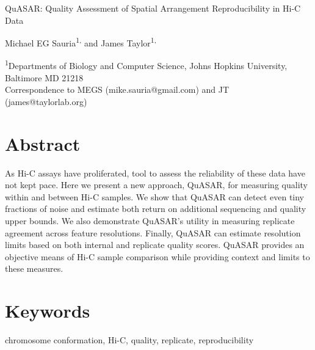 \documentclass[letterpaper,11pt,english]{article}
\begin{document}
{\sffamily

{\fontsize{16pt}{16pt}\selectfont QuASAR: Quality Assessment of Spatial Arrangement Reproducibility in Hi-C Data}

\vspace{1em}

Michael EG Sauria\textsuperscript{1,\dagger} and James Taylor\textsuperscript{1,\dagger}

\vspace{0.5em}

\textsuperscript{1}Departments of Biology and Computer Science, Johns Hopkins University, Baltimore MD 21218 \\
\textsuperscript{\dagger}Correspondence to MEGS (mike.sauria@gmail.com) and JT (james@taylorlab.org)

}

\section{Abstract}

As Hi-C assays have proliferated, tool to assess the reliability of these data have not kept pace. Here we present a new approach, QuASAR, for measuring quality within and between Hi-C samples. We show that QuASAR can detect even tiny fractions of noise and estimate both return on additional sequencing and quality upper bounds. We also demonstrate QuASAR’s utility in measuring replicate agreement across feature resolutions. Finally, QuASAR can estimate resolution limits based on both internal and replicate quality scores. QuASAR provides an objective means of Hi-C sample comparison while providing context and limits to these measures.

\section{Keywords}
chromosome conformation, Hi-C, quality, replicate, reproducibility %

\clearpage


\end{document}
